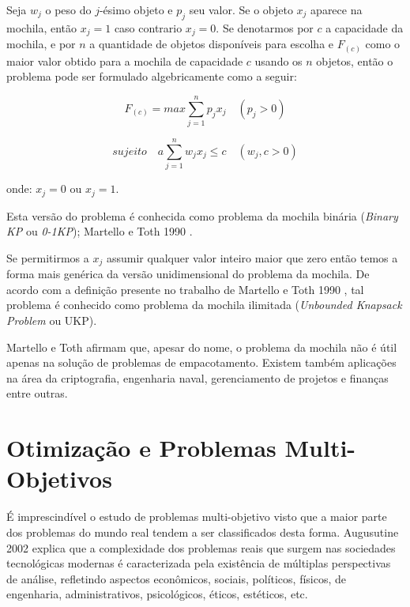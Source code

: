 Seja $w_j$ o peso do $j$-ésimo objeto e $p_j$ seu valor. Se o objeto $x_j$ aparece na mochila, então  $x_j=1$ caso contrario $x_j=0$. Se denotarmos por $c$ a capacidade da mochila, e por $n$ a quantidade de objetos disponíveis para escolha e $F_(c)$ como o maior valor obtido para a mochila de capacidade $c$ usando os $n$ objetos, então o problema pode ser formulado algebricamente como a seguir:

\begin{equation} \label{eq:taco-ret} 
F_{(c)} = max\sum_{j=1}^{n} p_{j}x_{j} \quad (p_{j} > 0 )
\end{equation}

\begin{equation} \label{eq:taco-ret} 
sujeito \quad a\sum_{j=1}^{n} w_{j}x_{j} \leq c \quad (w_{j},c > 0 )
\end{equation}

onde: $x_j=0$ ou $x_{j}=1$.

Esta versão do problema é conhecida como problema da mochila binária (\textit{Binary KP} ou \textit{0-1KP}); Martello e Toth 1990 \cite{Martello:1990:KPA:98124}.

Se permitirmos a \(x_{j}\) assumir qualquer valor inteiro maior que zero então temos a forma mais genérica da versão unidimensional do problema da mochila. De acordo com a definição presente no trabalho de Martello e Toth 1990 \cite{Martello:1990:KPA:98124}, tal problema é conhecido como problema da mochila ilimitada (\textit{Unbounded Knapsack Problem} ou UKP).

Martello e Toth afirmam que, apesar do nome, o problema da mochila não é útil apenas na solução de problemas de empacotamento. Existem também aplicações na área da criptografia, engenharia naval, gerenciamento de projetos e finanças entre outras.

\section{Otimização e Problemas Multi-Objetivos}
\label{sec-multi}

É imprescindível o estudo de problemas multi-objetivo visto que a maior parte dos problemas do mundo real tendem a ser classificados desta forma. Augusutine 2002 \cite{augustine2002offline} explica que a complexidade dos problemas reais que surgem nas sociedades tecnológicas modernas é caracterizada pela existência de múltiplas perspectivas de análise, refletindo aspectos econômicos, sociais, políticos, físicos, de engenharia, administrativos, psicológicos, éticos, estéticos, etc.

